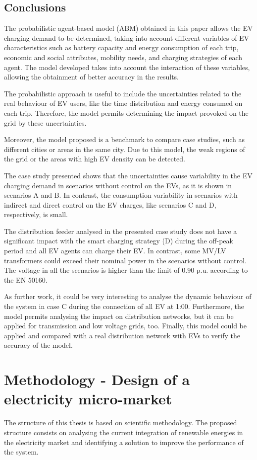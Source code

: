 \documentclass[a4paper,11pt,twoside,openright]{report}
\begin{document}
\section{Conclusions}

The probabilistic agent-based model (ABM) obtained in this paper allows the EV charging demand to be determined, taking into account different variables of EV characteristics such as battery capacity and energy consumption of each trip, economic and social attributes, mobility needs, and charging strategies of each agent. The model developed takes into account the interaction of these variables, allowing the obtainment of better accuracy in the results.

The probabilistic approach is useful to include the uncertainties related to the real behaviour of EV users, like the time distribution and energy consumed on each trip. Therefore, the model permits determining the impact provoked on the grid by these uncertainties.

Moreover, the model proposed is a benchmark to compare case studies, such as different cities or areas in the same city. Due to this model, the weak regions of the grid or the areas with high EV density can be detected.

The case study presented shows that the uncertainties cause variability in the EV charging demand in scenarios without control on the EVs, as it is shown in scenarios A and B. In contrast, the consumption variability in scenarios with indirect and direct control on the EV charges, like scenarios C and D, respectively, is small.

The distribution feeder analysed in the presented case study does not have a significant impact with the smart charging strategy (D) during the off-peak period and all EV agents can charge their EV. In contrast, some MV/LV transformers could exceed their nominal power in the scenarios without control. The voltage in all the scenarios is higher than the limit of 0.90 p.u. according to the EN 50160.

As further work, it could be very interesting to analyse the dynamic behaviour of the system in case C during the connection of all EV at 1:00. Furthermore, the model permits analysing the impact on distribution networks, but it can be applied for transmission and low voltage grids, too. Finally, this model could be applied and compared with a real distribution network with EVs to verify the accuracy of the model.

\chapter{Methodology - Design of a electricity micro-market}
The structure of this thesis is based on scientific methodology. The proposed structure consists on analysing the current integration of renewable energies in the electricity market and identifying a solution to improve the performance of the system.
\end{document}
